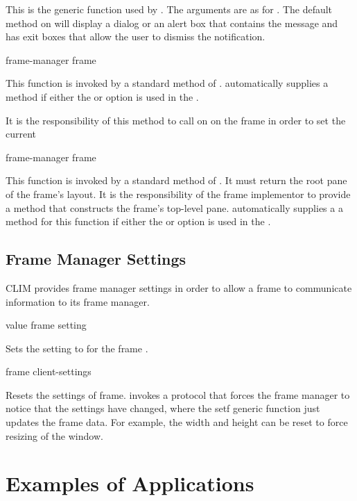 This is the generic function used by .  The arguments are as for
.  The default method on  will
display a dialog or an alert box that contains the message and has exit boxes
that allow the user to dismiss the notification.


 {frame-manager frame}

This function is invoked by a standard method of .
 automatically supplies a 
method if either the  or  option is used in the
.

It is the responsibility of this method to call  on  on
the frame in order to set the current

 {frame-manager frame}

This function is invoked by a standard method of .  It must
return the root pane of the frame's layout.  It is the responsibility of the
frame implementor to provide a method that constructs the frame's top-level
pane.   automatically supplies a a method for this
function if either the  or  option is used in the
.


\subsection {Frame Manager Settings}

CLIM provides frame manager settings in order to allow a frame to communicate
information to its frame manager.

 {value frame setting}

Sets the setting  to  for the frame .

 {frame \rest client-settings}

Resets the settings of frame.   invokes a protocol that forces
the frame manager to notice that the settings have changed, where the setf
generic function just updates the frame data.  For example, the width and height
can be reset to force resizing of the window.


\newpage
\section {Examples of Applications}

